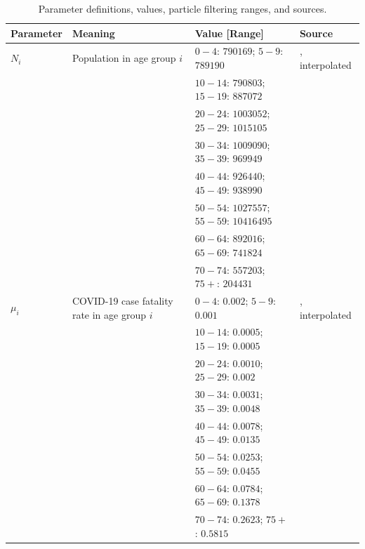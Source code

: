 \clearpage 

\begin{table}[H]
\tiny
 \centering
  \caption{Parameter definitions, values, particle filtering ranges, and sources.}
  \begin{tabular}{l p{5.5cm} l l}
  Parameter & Meaning & Value [Range] & Source \\
  \midrule
  $N_i$         & Population in age group $i$  & $0-4$:  $790169$; $5-9$: $789190 $ & \cite{ontario_census}, interpolated\\
                &   & $10-14$: $790803$; $15-19$: $887072$ &  \\
                &   & $20-24$: $1003052$; $25-29$: $1015105$ &  \\
                &   & $30-34$: $1009090$; $35-39$:  $969949$ &  \\
                &   & $40-44$:  $926440$; $45-49$:  $938990$ &  \\
                &   & $50-54$:   $1027557$; $55-59$: $10416495$ &  \\
                &   & $60-64$:  $892016$; $65-69$:  $741824$ &  \\
                &   & $70-74$:  $557203$; $75+$:  $204431$ &  \\
  
  $\mu_i$       & COVID-19 case fatality rate in age group $i$  & $0-4$: $0.002$; $5-9$: $0.001$  & \cite{publichealthontario}, interpolated\\
                &   & $10-14$:   $0.0005$; $15-19$:  $0.0005$ &  \\
                &   & $20-24$:  $0.0010$; $25-29$:   $0.002$ &  \\
                &   & $30-34$:  $0.0031$; $35-39$:   $0.0048$ &  \\
                &   & $40-44$:   $0.0078$; $45-49$:   $0.0135$  \\
                &   & $50-54$:    $0.0253$; $55-59$:   $0.0455$ &  \\
                &   & $60-64$:   $0.0784$; $65-69$:  $0.1378$ &  \\
                &   & $70-74$:  $0.2623$; $75+$:   $0.5815$ &  \\
                

\end{tabular}
\end{table}

